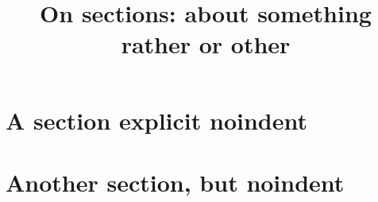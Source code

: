 \documentclass[apa,noindentfirst]{rootmos}
\title{On sections: about something rather or other}
\begin{document}
\section{A section \w explicit noindent}
\noindent
\kant[1-2]

\section{Another section, but \wo noindent}
\kant[3-4]
\end{document}
